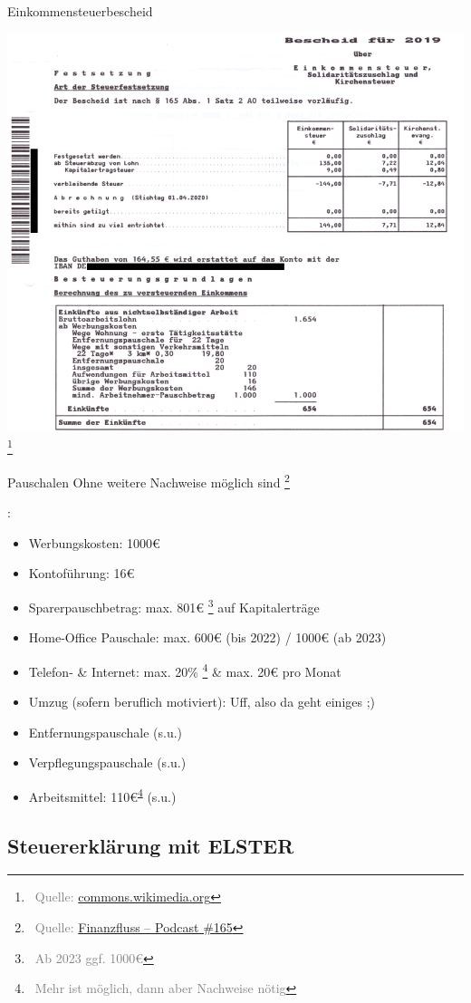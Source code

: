 \documentclass{beamer}
\let\oldfootnote\footnote
\renewcommand{\footnote}[1]
{%
	\oldfootnote
	{
		\tiny
		\textcolor{gray}{\ #1}
	}%
}
\renewcommand{\footref}[1]{\textsuperscript{\ref{#1}}}
\newcommand{\citeurl}[2]
{%
	\footnote{Quelle: \href{#1}{#2}}
}
\begin{document}
			\begin{frame}{Einkommensteuerbescheid}
				\begin{center}
					\includegraphics[width=0.55\linewidth]{images/einkommensteuerbescheid_2019}
					\citeurl{https://de.wikipedia.org/wiki/Datei:Einkommensteuerbescheid_2019.pdf}{commons.wikimedia.org}
				\end{center}
			\end{frame}
		
			\begin{frame}{Pauschalen}
				Ohne weitere Nachweise möglich sind\citeurl{https://www.finanzfluss.de/podcast/folge-165/}{Finanzfluss -- Podcast \#165}:
				\begin{itemize}
					\item Werbungskosten: 1000€
					\item Kontoführung: 16€
					\item Sparerpauschbetrag: max. 801€\footnote{Ab 2023 ggf. 1000€} auf Kapitalerträge
					\item Home-Office Pauschale: max. 600€ (bis 2022) / 1000€ (ab 2023)
					\item Telefon- \& Internet: max. 20\%\footnote{\label{mehr-moeglich}Mehr ist möglich, dann aber Nachweise nötig} \& max. 20€ pro Monat
					\item Umzug (sofern beruflich motiviert): Uff, also da geht einiges ;)
					\item Entfernungspauschale (s.u.)
					\item Verpflegungspauschale (s.u.)
					\item Arbeitsmittel: 110€\footref{mehr-moeglich} (s.u.)
				\end{itemize}
			\end{frame}
		
		\subsection{Steuererklärung mit ELSTER}
		
\end{document}
